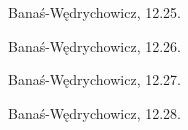 \begin{integral}
Banaś-Wędrychowicz, 12.25.
\end{integral}

\begin{integral}
Banaś-Wędrychowicz, 12.26.
\end{integral}

\begin{integral}
Banaś-Wędrychowicz, 12.27.
\end{integral}

\begin{integral}
Banaś-Wędrychowicz, 12.28.
\end{integral}

%